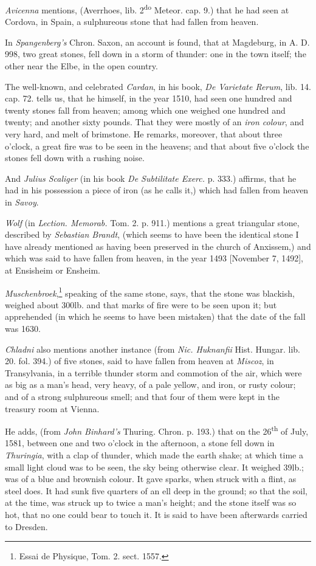 \documentclass[a4paper, 12pt, oneside]{article}
\begin{document}
\emph{Avicenna} mentions, (Averrhoes, lib. 2\textsuperscript{do} Meteor. cap. 9.) that he had seen at Cordova, in Spain, a sulphureous stone that had fallen from heaven.

In \emph{Spangenberg's} Chron. Saxon, an account is found, that at Magdeburg, in A. D. 998, two great stones, fell down in a storm of thunder: one in the town itself; the other near the Elbe, in the open country.

The well-known, and celebrated \emph{Cardan}, in his book, \emph{De Varietate Rerum}, lib. 14. cap. 72. tells us, that he himself, in the year 1510, had seen one hundred and twenty stones fall from heaven; among which one weighed one hundred and twenty; and another sixty pounds. That they were mostly of an \emph{iron colour}, and very hard, and melt of brimstone. He remarks, moreover, that about three o'clock, a great fire was to be seen in the heavens; and that about five o'clock the stones fell down with a rushing noise.

And \emph{Julius Scaliger} (in his book \emph{De Subtilitate Exerc.} p. 333.) affirms, that he had in his possession a piece of iron (as he calls it,) which had fallen from heaven in \emph{Savoy}.

\emph{Wolf} (in \emph{Lection. Memorab.} Tom. 2. p. 911.) mentions a great triangular stone, described by \emph{Sebastian Brandt}, (which seems to have been the identical stone I have already mentioned as having been preserved in the church of Anxissem,) and which was said to have fallen from heaven, in the year 1493 [November 7, 1492], at Ensisheim or Ensheim.

\emph{Muschenbroek},\footnote{Essai de Physique, Tom. 2. sect. 1557.} speaking of the same stone, says, that the stone was blackish, weighed about 300lb. and that marks of fire were to be seen upon it; but apprehended (in which he seems to have been mistaken) that the date of the fall was 1630.

\emph{Chladni} also mentions another instance (from \emph{Nic. Huknanfii} Hist. Hungar. lib. 20. fol. 394.) of five stones, said to have fallen from heaven at \emph{Miscoz}, in Transylvania, in a terrible thunder storm and commotion of the air, which were as big as a man's head, very heavy, of a pale yellow, and iron, or rusty colour; and of a strong sulphureous smell; and that four of them were kept in the treasury room at Vienna.

He adds, (from \emph{John Binhard's} Thuring. Chron. p. 193.) that on the 26\textsuperscript{th} of July, 1581, between one and two o'clock in the afternoon, a stone fell down in \emph{Thuringia}, with a clap of thunder, which made the earth shake; at which time a small light cloud was to be seen, the sky being otherwise clear. It weighed 39lb.; was of a blue and brownish colour. It gave sparks, when struck with a flint, as steel does. It had sunk five quarters of an ell deep in the ground; so that the soil, at the time, was struck up to twice a man's height; and the stone itself was so hot, that no one could bear to touch it. It is said to have been afterwards carried to Dresden.
\end{document}
